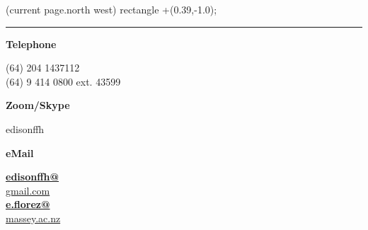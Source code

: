 \pagestyle{fancy}
\fancyhf{}
\fancyhead[R]{\textcolor{gray}{\scriptsize Last update \today}}
\fancyfoot[C]{\thepage}

\begin{minipage}{0.32\columnwidth}

     (current
    page.north west) rectangle +(0.39\paperwidth,-1.0\paperheight);

    \vspace*{-16.5mm}
    \noindent
    {\color{black!75!white}\rule{1.06\linewidth}{0.15mm} }

    \vspace*{-10mm}
    \begin{flushright}
        \textcolor{my_blue}{\bf\Large Telephone}\\ \vspace*{3mm}

        (64) 204 1437112 \\ \vspace*{-0.5mm}
        (64) 9 414 0800 ext. 43599\\
        \vspace*{4mm}

        \textcolor{my_blue}{\bf\Large Zoom/Skype}\\ \vspace*{3mm}

        edisonffh%
        \vspace*{4mm}

        \textcolor{my_blue}{\bf\Large eMail}\\ \vspace*{3mm}

        \href{mailto:edisonffh@gmail.com}{\textbf{edisonffh@}\\[-1mm]gmail.com}\\

        \href{mailto:e.florez@massey.ac.nz}{\textbf{e.florez@}\\[-2mm]massey.ac.nz}\\
        \vspace*{6mm}


\end{flushright}
\end{minipage}
